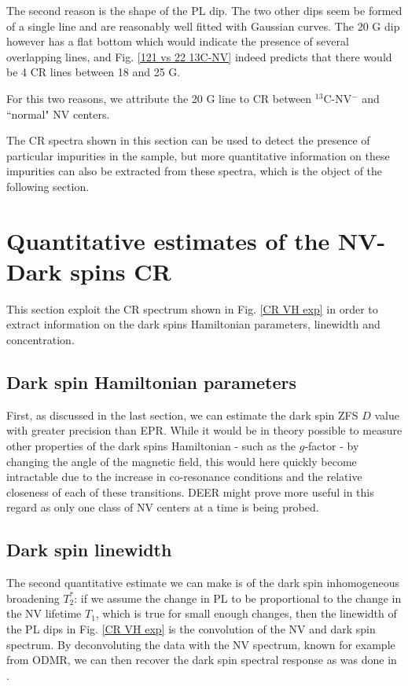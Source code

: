 \documentclass[a4paper, 11pt]{report}
\begin{document}
The second reason is the shape of the PL dip. The two other dips seem be formed of a single line and are reasonably well fitted with Gaussian curves. The 20 G dip however has a flat bottom which would indicate the presence of several overlapping lines, and Fig. \ref{121 vs 22 13C-NV} indeed predicts that there would be 4 CR lines between 18 and 25 G.

For this two reasons, we attribute the 20 G line to CR between $^{13}$C-NV$^-$ and ``normal" NV centers.

\bigskip

The CR spectra shown in this section can be used to detect the presence of particular impurities in the sample, but more quantitative information on these impurities can also be extracted from these spectra, which is the object of the following section.

\section{Quantitative estimates of the NV-Dark spins CR}

This section exploit the CR spectrum shown in Fig. \ref{CR VH exp} in order to extract information on the dark spins Hamiltonian parameters, linewidth and concentration.

\subsection{Dark spin Hamiltonian parameters}

First, as discussed in the last section, we can estimate the dark spin ZFS $D$ value with greater precision than EPR. While it would be in theory possible to measure other properties of the dark spins Hamiltonian - such as the $g$-factor - by changing the angle of the magnetic field, this would here quickly become intractable due to the increase in co-resonance conditions and the relative closeness of each of these transitions. DEER might prove more useful in this regard as only one class of NV centers at a time is being probed.

\subsection{Dark spin linewidth}

The second quantitative estimate we can make is of the dark spin inhomogeneous broadening $T_2^*$: if we assume the change in PL to be proportional to the change in the NV lifetime $T_1$, which is true for small enough changes, then the linewidth of the PL dips in Fig. \ref{CR VH exp} is the convolution of the NV and dark spin spectrum. By deconvoluting the data with the NV spectrum, known for example from ODMR, we can then recover the dark spin spectral response as was done in \citep{hall2016detection}. 
\end{document}
